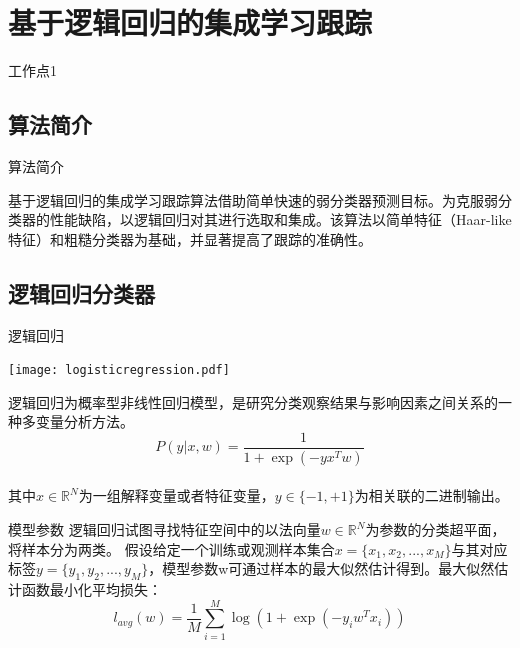 \section{基于逻辑回归的集成学习跟踪}

\begin{frame}{工作点1}
    \tableofcontents[sections=\thesection]
\end{frame}

\subsection{算法简介}
\begin{frame}{算法简介}


\begin{block}{}
    基于逻辑回归的集成学习跟踪算法借助简单快速的弱分类器预测目标。为克服弱分类器的性能缺陷，以逻辑回归对其进行选取和集成。该算法以简单特征（Haar-like特征）和粗糙分类器为基础，并显著提高了跟踪的准确性。
    \end{block}
\end{frame}

\subsection{逻辑回归分类器}

\begin{frame}{逻辑回归}

\begin{center}
\texttt{[image: logisticregression.pdf]}
\end{center}

逻辑回归为概率型非线性回归模型，是研究分类观察结果与影响因素之间关系的一种多变量分析方法。
~\\
\begin{equation}
P(y|x,w)=\frac{1}{1+\exp(-yx^{T}w) }
\label{eq:LR}
\end{equation}
~\\
其中$ x\in \mathbb{R}^{N} $为一组解释变量或者特征变量，$ y\in \{ -1,+1 \} $为相关联的二进制输出。

\end{frame}
\begin{frame}{模型参数}
逻辑回归试图寻找特征空间中的以法向量$ w\in \mathbb{R}^{N} $为参数的分类超平面，将样本分为两类。
假设给定一个训练或观测样本集合$ x=\{x_{1},x_{2},...,x_{M}\} $与其对应标签$ y=\{y_{1},y_{2},...,y_{M}\} $，模型参数w可通过样本的最大似然估计得到。最大似然估计函数最小化平均损失：
~\\
\begin{equation}
l_{avg}(w)=\frac{1}{M}\sum _{i=1}^{M} \log \left(1+\exp \left( -y_{i} w^{T}x_{i}\right)  \right)
\end{equation}
~\\
\end{frame}

